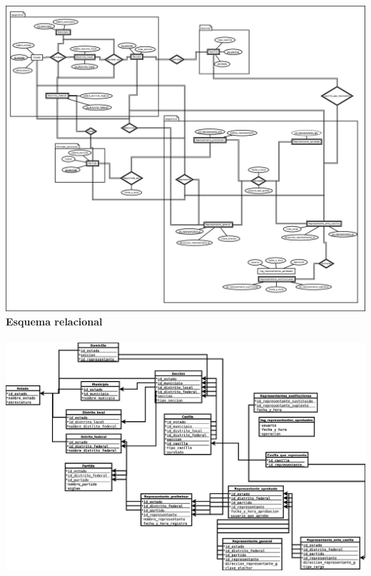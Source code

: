 \documentclass[a4paper,twoside,11pt]{article}
\begin{document}
\includegraphics[scale=0.15]{e-r}\\
\newpage
\textbf{Esquema relacional}\\\\
\includegraphics[scale=0.25]{esquema_relacional}\\
\end{document}
